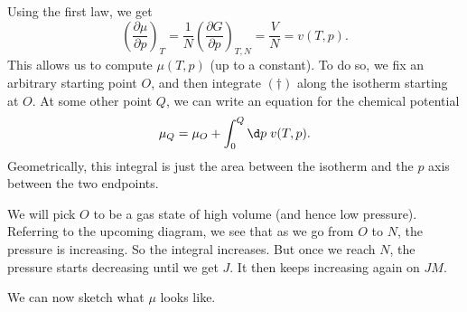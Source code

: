 \documentclass[a4paper]{article}
\def\isothermia{(1.6,0.3) (1.7,0.19847) (1.8,0.14429) (1.9,0.11496) (2.0,0.10000) (2.1,0.09349) (2.2,0.09194)}
\def\isothermib{(2.2,0.09194) (2.3,0.09328) (2.4,0.09623) (2.5,0.10000) (2.6,0.10411) (2.7,0.10825) (2.8,0.11224) (2.9,0.11600) (3.0,0.11944) (3.1,0.12257) (3.2,0.12536) (3.3,0.12782) (3.4,0.12997) (3.5,0.13184) (3.6,0.13343) (3.7,0.13477) (3.8,0.13588) (3.9,0.13679) (4.0,0.13750) (4.1,0.13804) (4.2,0.13843) (4.3,0.13867) (4.4,0.13879) (4.5,0.13880)}
\def\isothermic{(4.5,0.13880) (4.6,0.13871) (4.7,0.13852) (4.8,0.13825) (4.9,0.13791) (5.0,0.13750) (5.1,0.13703) (5.2,0.13652) (5.3,0.13595) (5.4,0.13535) (5.5,0.13471) (5.6,0.13404) (5.7,0.13334) (5.8,0.13262) (5.9,0.13187) (6.0,0.13111) (6.1,0.13033) (6.2,0.12954) (6.3,0.12874) (6.4,0.12793) (6.5,0.12711) (6.6,0.12629) (6.7,0.12546) (6.8,0.12463) (6.9,0.12379) (7.0,0.12296) (7.1,0.12212) (7.2,0.12129) (7.3,0.12046) (7.4,0.11963) (7.5,0.11880) (7.6,0.11798) (7.7,0.11716) (7.8,0.11635) (7.9,0.11554) (8.0,0.11473) (8.1,0.11393) (8.2,0.11314) (8.3,0.11235) (8.4,0.11157) (8.5,0.11080) (8.6,0.11003) (8.7,0.10927) (8.8,0.10851) (8.9,0.10776) (9.0,0.10702) (9.1,0.10629) (9.2,0.10556) (9.3,0.10484) (9.4,0.10413) (9.5,0.10342) (9.6,0.10272) (9.7,0.10203) (9.8,0.10135) (9.9,0.10067) (10.0,0.10000) (10.1,0.09934) (10.2,0.09868) (10.3,0.09803) (10.4,0.09739) (10.5,0.09675) (10.6,0.09613) (10.7,0.09550) (10.8,0.09489) (10.9,0.09428) (11.0,0.09368) (11.1,0.09308) (11.2,0.09249) (11.3,0.09191) (11.4,0.09133) (11.5,0.09076) (11.6,0.09020) (11.7,0.08964) (11.8,0.08909) (11.9,0.08854) (12.0,0.08801) (12.1,0.08747) (12.2,0.08694) (12.3,0.08642) (12.4,0.08590) (12.5,0.08539) (12.6,0.08489) (12.7,0.08438) (12.8,0.08389) (12.9,0.08340) (13.0,0.08291) (13.1,0.08243) (13.2,0.08196) (13.3,0.08149) (13.4,0.08103) (13.5,0.08057) (13.6,0.08011) (13.7,0.07966) (13.8,0.07921) (13.9,0.07877) (14.0,0.07834) (14.1,0.07790) (14.2,0.07748) (14.3,0.07705) (14.4,0.07663) (14.5,0.07622) (14.6,0.07581) (14.7,0.07540) (14.8,0.07500) (14.9,0.07460) (15.0,0.07421)}
\begin{document}
Using the first law, we get
\[
  \left(\frac{\partial \mu}{\partial p}\right)_T = \frac{1}{N} \left(\frac{\partial G}{\partial p}\right)_{T, N} = \frac{V}{N} = v(T, p).\tag{$\dagger$}
\]
This allows us to compute $\mu(T, p)$ (up to a constant). To do so, we fix an arbitrary starting point $O$, and then integrate $(\dagger)$ along the isotherm starting at $O$. At some other point $Q$, we can write an equation for the chemical potential
\[
  \mu_Q= \mu_O + \int_0^Q \d p\; v(T, p).
\]
Geometrically, this integral is just the area between the isotherm and the $p$ axis between the two endpoints.

We will pick $O$ to be a gas state of high volume (and hence low pressure). Referring to the upcoming diagram, we see that as we go from $O$ to $N$, the pressure is increasing. So the integral increases. But once we reach $N$, the pressure starts decreasing until we get $J$. It then keeps increasing again on $JM$.
\begin{center}
\end{center}
We can now sketch what $\mu$ looks like.
\end{document}
